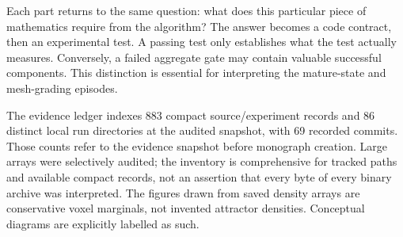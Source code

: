 \documentclass[11pt,oneside]{book}
\theoremstyle{definition}\newtheorem{definition}[theorem]{Definition}\newtheorem{example}[theorem]{Example}
\theoremstyle{remark}\newtheorem{remark}[theorem]{Remark}
\begin{document}
Each part returns to the same question: what does this particular piece of mathematics require from the algorithm? The answer becomes a code contract, then an experimental test. A passing test only establishes what the test actually measures. Conversely, a failed aggregate gate may contain valuable successful components. This distinction is essential for interpreting the mature-state and mesh-grading episodes.

The evidence ledger indexes 883 compact source/experiment records and 86 distinct local run directories at the audited snapshot, with 69 recorded commits. Those counts refer to the evidence snapshot before monograph creation. Large arrays were selectively audited; the inventory is comprehensive for tracked paths and available compact records, not an assertion that every byte of every binary archive was interpreted. The figures drawn from saved density arrays are conservative voxel marginals, not invented attractor densities. Conceptual diagrams are explicitly labelled as such.

\tableofcontents\listoffigures\listoftables
\end{document}
